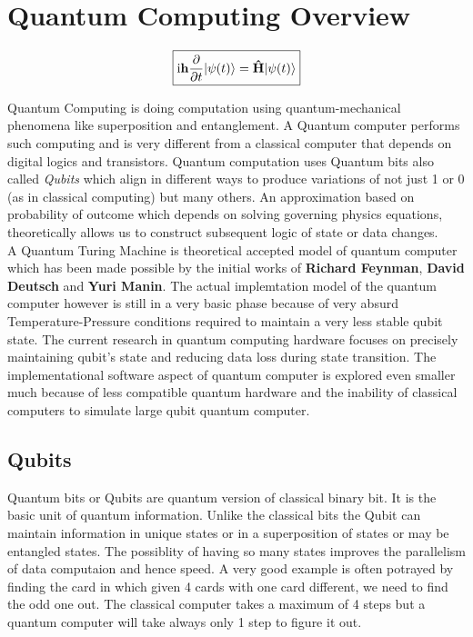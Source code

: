 \chapter{Quantum Computing Overview}
\graphicspath{ {./images/} }

\[ \boxed {\mbox{i\textbf{h}}\dfrac{\partial}{\partial t}|\psi(t)\rangle = \bm{\hat{\textnormal{\bfseries H}}} |\psi(t)\rangle }
\]

Quantum Computing is doing computation using quantum-mechanical phenomena like superposition and entanglement. A Quantum computer performs such computing and is very different from a classical computer that depends on digital logics and transistors. Quantum computation uses Quantum bits also called \textit{Qubits} which align in different ways to produce variations of not just 1 or 0 (as in classical computing) but many others. An approximation based on probability of outcome which depends on solving governing physics equations, theoretically allows us to construct subsequent logic of state or data changes.\\

A Quantum Turing Machine is theoretical accepted model of quantum computer which has been made possible by the initial works of \textbf{Richard Feynman}, \textbf{David Deutsch}  and \textbf{Yuri Manin}. The actual implemtation model of the quantum computer however is still in a very basic phase because of very absurd Temperature-Pressure conditions required to maintain a very less stable qubit state. The current research in quantum computing hardware focuses on precisely maintaining qubit's state and reducing data loss during state transition. The implementational software aspect of quantum computer is explored even smaller much because of less compatible quantum hardware and the inability of classical computers to simulate large qubit quantum computer.\\

\section{Qubits}
Quantum bits or Qubits are quantum version of classical binary bit. It is the basic unit of quantum information. Unlike the classical bits the Qubit can maintain information in unique states or in a superposition of states or may be  entangled states. The possiblity of having so many states improves the parallelism of data computaion and hence speed. A very good example is often potrayed by finding the card in which given 4 cards with one card different, we need to find the odd one out. The classical computer takes a maximum of 4 steps but a quantum computer will take always only 1 step to figure it out. 

